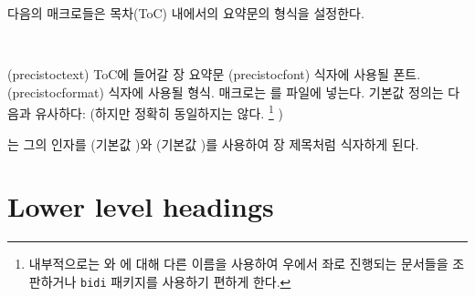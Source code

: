 다음의 매크로들은 목차(ToC) 내에서의 요약문의 형식을 설정한다.
\begin{syntax}
\cmd{\precistoctext} \cmd{\precistocfont} \cmd{\precistocformat} \\
\end{syntax}
\glossary(precistoctext)%
  {}%
  {ToC에 들어갈 장 요약문 }
\glossary(precistocfont)%
  {}%
  { 식자에 사용될 폰트.}
\glossary(precistocformat)%
  {}%
  { 식자에 사용될 형식.}
\cmd{\chapterprecistoc} 매크로는 \cmd{\precistoctext}를
 파일에 넣는다.
기본값 정의는 다음과 유사하다:
(하지만 정확히 동일하지는 않다.%
\footnote{내부적으로는 와 에 대해 다른 이름을 사용하여
우에서 좌로 진행되는 문서들을 조판하거나 \texttt{bidi} 패키지를 사용하기 편하게 한다.}
)

\begin{lcode}
\DeclareRobustCommand{\precistoctext}[1]{%
  {\nopagebreak\leftskip \cftchapterindent\relax
    \advance\leftskip \cftchapternumwidth\relax
    \rightskip \@tocrmarg\relax
    \precistocformat\precistocfont #1\par}}
\end{lcode}
\toc{} \cmd{\precistoctext}는 그의 인자를 \cmd{\precistocfont} (기본값 \cmd{\itshape})와
\cmd{\precistocformat} (기본값 \cmd{\noindent})를 사용하여
장 제목처럼 식자하게 된다.



\section{Lower level headings}

